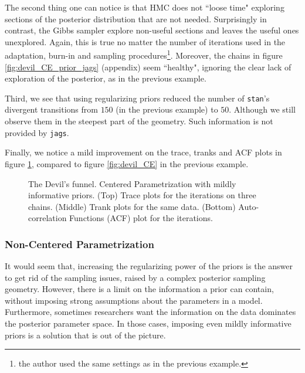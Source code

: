 The second thing one can notice is that HMC does not ``loose time" exploring sections of the posterior distribution that are not needed. Surprisingly in contrast, the Gibbs sampler explore non-useful sections and leaves the useful ones unexplored. Again, this is true no matter the number of iterations used in the adaptation, burn-in and sampling procedures\footnote{the author used the same settings as in the previous example.}. Moreover, the chains in figure \ref{fig:devil_CE_prior_jags} (appendix) seem ``healthy", ignoring the clear lack of exploration of the posterior, as in the previous example.

Third, we see that using regularizing priors reduced the number of \texttt{stan}'s divergent transitions from $150$ (in the previous example) to $50$. Although we still observe them in the steepest part of the geometry. Such information is not provided by \texttt{jags}.

Finally, we notice a mild improvement on the trace, tranks and ACF plots in figure \ref{fig:devil_prior}, compared to figure \ref{fig:devil_CE} in the previous example.
%
\begin{figure}[h] 
	\centering
	\begin{subfigure}
		\texttt{[image: 2\_trace\_CE\_priors]}
	\end{subfigure}
	\begin{subfigure}
		\texttt{[image: 2\_trank\_CE\_priors]}
	\end{subfigure}
	\begin{subfigure}
		\texttt{[image: 2\_acf\_CE\_priors]}
	\end{subfigure}
	\caption[The Devil's funnel. Centered Parametrization with prior information.]%
	{The Devil's funnel. Centered Parametrization with mildly informative priors. (Top) Trace plots for the iterations on three chains. (Middle) Trank plots for the same data. (Bottom) Auto-correlation Functions (ACF) plot for the iterations.}
	\label{fig:devil_prior}
\end{figure}


\subsubsection{Non-Centered Parametrization}

It would seem that, increasing the regularizing power of the priors is the answer to get rid of the sampling issues, raised by a complex posterior sampling geometry. However, there is a limit on the information a prior can contain, without imposing strong assumptions about the parameters in a model. Furthermore, sometimes researchers want the information on the data dominates the posterior parameter space. In those cases, imposing even mildly informative priors is a solution that is out of the picture.


